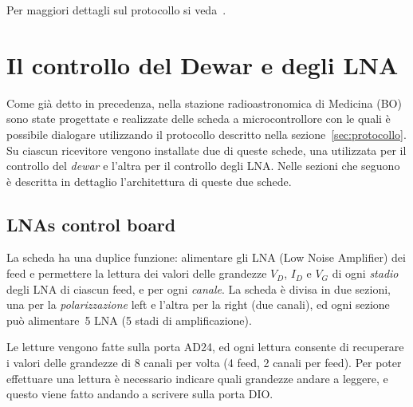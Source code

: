 Per maggiori dettagli sul protocollo si veda~\cite{mcontroller-protocol}.


\section{Il controllo del Dewar e degli LNA}
Come gi\`a detto in precedenza, nella stazione radioastronomica di Medicina (BO)
sono state progettate e realizzate delle scheda a microcontrollore con le quali \`e possibile
dialogare utilizzando il protocollo descritto nella sezione~\ref{sec:protocollo}.
Su ciascun ricevitore vengono installate due di queste schede, una utilizzata per il controllo del \emph{dewar}
e l'altra per il controllo degli LNA. Nelle sezioni che seguono \`e descritta in dettaglio l'architettura
di queste due schede.

\subsection{LNAs control board\label{sec:lna-section}}
La scheda ha una duplice funzione: alimentare gli LNA 
(Low Noise Amplifier) dei feed e permettere la lettura
dei valori delle grandezze
$V_D$, $I_D$ e $V_G$ di ogni \emph{stadio} degli LNA di ciascun feed, e per ogni \emph{canale}. La scheda 
\`e divisa in due sezioni, una per la \emph{polarizzazione} 
left e l'altra per la right (due canali), ed ogni sezione
pu\`o alimentare~5 LNA (5 stadi di amplificazione).

Le letture vengono fatte sulla porta AD24, ed ogni lettura consente di recuperare i valori delle grandezze
di 8 canali per volta (4 feed, 2 canali per feed). 
Per poter effettuare una lettura \`e necessario indicare
quali grandezze andare a leggere, e questo viene fatto andando a scrivere sulla porta DIO. 

